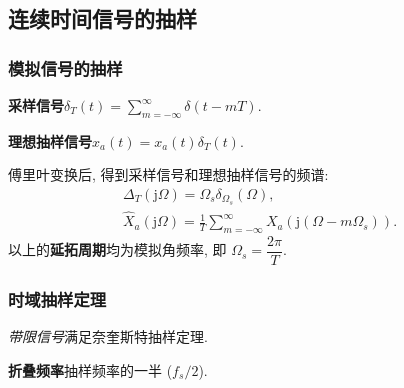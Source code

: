 \subsection{连续时间信号的抽样}
\subsubsection{模拟信号的抽样}
\textbf{采样信号}\quad $\delta_T(t)=\displaystyle\sum_{m=-\infty}^{\infty}\delta(t-mT)$.

\textbf{理想抽样信号}\quad $\hat{x}_a(t)=x_a(t)\delta_T(t)$.

傅里叶变换后, 得到采样信号和理想抽样信号的频谱:
\begin{gather}
    \Delta_T(\mathrm{j}\Omega)=\Omega_s\delta_{\Omega_s}(\Omega), \\
    \hat{X}_a(\mathrm{j}\Omega)=\frac{1}{T}\sum_{m=-\infty}^{\infty}X_a\left(\mathrm{j}\left(\Omega-m\Omega_s\right)\right).
\end{gather}
以上的\textbf{延拓周期}均为模拟角频率, 即 $\Omega_s=\dfrac{2\pi}{T}$.

\subsubsection{时域抽样定理}
\textit{带限信号}满足奈奎斯特抽样定理.

\textbf{折叠频率}\quad 抽样频率的一半 ($f_s/2$).
